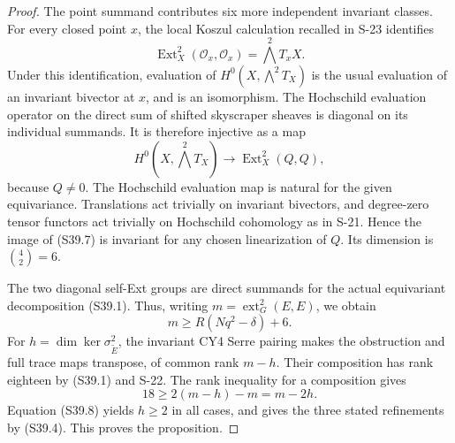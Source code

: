 \begin{proof}
The point summand contributes six more independent invariant classes.
For every closed point $x$, the local Koszul calculation recalled in S-23
identifies
\[
 \operatorname{Ext}^2_X(\mathcal O_x,\mathcal O_x)
      =\bigwedge^2T_xX.
\]
Under this identification, evaluation of
$H^0(X,\bigwedge^2T_X)$ is the usual evaluation of an invariant bivector
at $x$, and is an isomorphism. The Hochschild evaluation operator on the direct sum of shifted
skyscraper sheaves is diagonal on its individual summands. It is therefore
injective as a map
\[
 H^0(X,\bigwedge^2T_X)\longrightarrow
            \operatorname{Ext}^2_X(Q,Q),
 \tag{S39.7}
\]
because $Q\ne0$. The Hochschild evaluation map is natural for the given
equivariance. Translations act trivially on invariant bivectors, and
degree-zero tensor functors act trivially on Hochschild cohomology as in
S-21. Hence the image of (S39.7) is invariant for any chosen linearization
of $Q$. Its dimension is $\binom42=6$.

The two diagonal self-Ext groups are direct summands for the actual
equivariant decomposition (S39.1). Thus, writing
$m=\operatorname{ext}^2_G(E,E)$, we obtain
\[
 m\ge R(Nq^2-\delta)+6.
 \tag{S39.8}
\]
For $h=\dim\ker\sigma^2_{\widetilde E}$, the invariant CY4 Serre
pairing makes the obstruction and full trace maps transpose, of common
rank $m-h$. Their composition has rank eighteen by (S39.1) and S-22.
The rank inequality for a composition gives
\[
 18\ge2(m-h)-m=m-2h.
\]
Equation (S39.8) yields $h\ge2$ in all cases, and gives the three stated
refinements by (S39.4). This proves the proposition.
\end{proof}

